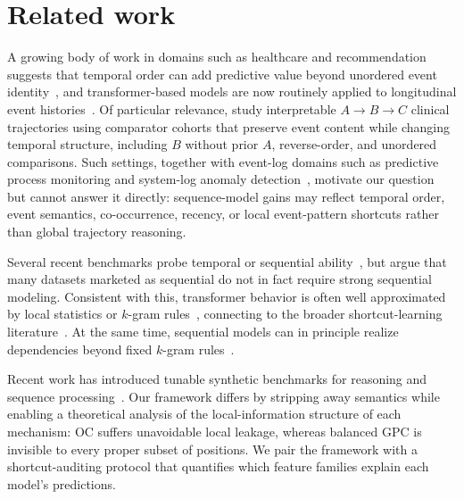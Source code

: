 \documentclass[fullpaper]{nldl}
\theoremstyle{plain}
\theoremstyle{definition}
\theoremstyle{remark}
\begin{document}
\section{Related work}
\label{sec:related_work}
A growing body of work in domains such as healthcare and recommendation suggests that temporal order can add predictive value beyond unordered event identity~\citep{beaney2024coded_disease_representations,placido2023pancreatic_trajectories,pollington2026trajectory_review,kimLostSequenceLarge2025b}, and transformer-based models are now routinely applied to longitudinal event histories~\citep{li2020behrt,rasmy2021medbert,savcisens2024using,delphi2025transformer}. Of particular relevance, \citet{edelman2026order_specific_ehr} study interpretable \(A\to B\to C\) clinical trajectories using comparator cohorts that preserve event content while changing temporal structure, including \(B\) without prior \(A\), reverse-order, and unordered comparisons. Such settings, together with event-log domains such as predictive process monitoring and system-log anomaly detection~\citep{teinemaa2019outcome,du2017deeplog}, motivate our question but cannot answer it directly: sequence-model gains may reflect temporal order, event semantics, co-occurrence, recency, or local event-pattern shortcuts rather than global trajectory reasoning.

Several recent benchmarks probe temporal or sequential ability~\citep{fatemiTESTTIMEBENCHMARK2025,cui2025timertemporalinstructionmodeling}, but \citet{klenitskiyDoesItLook2024} argue that many datasets marketed as sequential do not in fact require strong sequential modeling. Consistent with this, transformer behavior is often well approximated by local statistics or $k$-gram rules~\citep{nguyen2024understanding,kimLostSequenceLarge2025b,bediFidelityMedicalReasoning2025}, connecting to the broader shortcut-learning literature~\citep{mccoy2019right,geirhos2020shortcut,mirzadeh2024gsm}. At the same time, sequential models can in principle realize dependencies beyond fixed \(k\)-gram rules~\citep{olsson2022induction,guMambaLinearTimeSequence2024}.

Recent work has introduced tunable synthetic benchmarks for reasoning and sequence processing~\citep{kaiserCogniLoadSyntheticNatural2025,ramezanaliSeqBenchTunableBenchmark2025}. Our framework differs by stripping away semantics while enabling a theoretical analysis of the local-information structure of each mechanism: OC suffers unavoidable local leakage, whereas balanced GPC is invisible to every proper subset of positions. We pair the framework with a shortcut-auditing protocol that quantifies which feature families explain each model's predictions.
\end{document}
